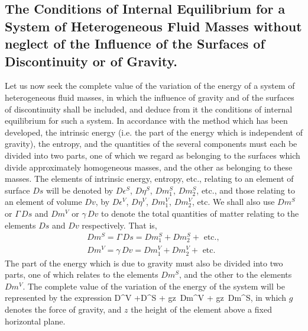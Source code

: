 \documentclass[12pt]{memoir}
\newcommand{\dd}{\delta}
\begin{document}
\subsection{The Conditions of Internal Equilibrium for a System of Heterogeneous Fluid Masses without neglect of the Influence of the Surfaces of Discontinuity or of Gravity.}
Let us now seek the complete value of the variation of the energy of a system of heterogeneous fluid masses, in which the influence of gravity and of the surfaces of discontinuity shall be included, and deduce from it the conditions of internal equilibrium for such a system. In accordance with the method which has been developed, the intrinsic energy (i.e. the part of the energy which is independent of gravity), the entropy, and the quantities of the several components must each be divided into two parts, one of which we regard as belonging to the surfaces which divide approximately homogeneous masses, and the other as belonging to these masses. The elements of intrinsic energy, entropy, etc., relating to an element of surface $Ds$ will be denoted by $D\epsilon^S$, $D\eta^S$, $Dm_1^S$, $Dm_2^S$, etc., and those relating to an element of volume $Dv$, by $D\epsilon^V$, $D\eta^V$, $Dm_1^V$, $Dm_2^V$, etc. We shall also use $Dm^S$ or $\Gamma \, Ds$ and $Dm^V$ or $\gamma \, Dv$ to denote the total quantities of matter relating to the elements $Ds$ and $Dv$ respectively. That is,
\begin{align}Dm^S = \Gamma \, Ds = Dm_1^S + Dm_2^S + \text{ etc.},  \label{597} \\
Dm^V = \gamma \, Dv = Dm_1^V + Dm_2^V+ \text{ etc.}       \label{598} \end{align}
The part of the energy which is due to gravity must also be divided into two parts, one of which relates to the elements $Dm^S$, and the other to the elements $Dm^V$. The complete value of the variation of the energy of the system will be represented by the expression
\eqs \dd \int D\epsilon^V +\dd \int D\epsilon^S + \dd \int gz\, Dm^V + \dd \int gz\, Dm^S,  \label{599} \eqe
in which $g$ denotes the force of gravity, and $z$ the height of the element above a fixed horizontal plane.
\end{document}
